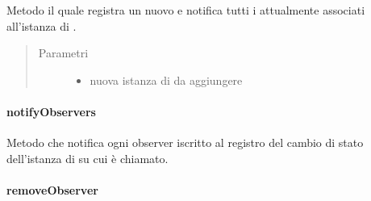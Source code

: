 \documentclass[letterpaper,10pt,italian,openany,oneside]{sphinxmanual}
\begin{document}
\begin{fulllineitems}
\label{\detokenize{source/it/unicam/cs/pa/mastermind/gamecore/Observable:it.unicam.cs.pa.mastermind.gamecore.Observable.addObserver(Observer)}}
Metodo il quale registra un nuovo  e notifica tutti i  attualmente associati all’istanza di .
\begin{quote}\begin{description}
\item[{Parametri}] \leavevmode\begin{itemize}
\item {} 
 \textendash{} nuova istanza di  da aggiungere

\end{itemize}

\end{description}\end{quote}

\end{fulllineitems}



\paragraph{notifyObservers}
\label{\detokenize{source/it/unicam/cs/pa/mastermind/gamecore/Observable:notifyobservers}}

\begin{fulllineitems}
\label{\detokenize{source/it/unicam/cs/pa/mastermind/gamecore/Observable:it.unicam.cs.pa.mastermind.gamecore.Observable.notifyObservers()}}
Metodo che notifica ogni observer iscritto al registro  del cambio di stato dell’istanza di  su cui è chiamato.

\end{fulllineitems}



\paragraph{removeObserver}
\label{\detokenize{source/it/unicam/cs/pa/mastermind/gamecore/Observable:removeobserver}}
\end{document}
